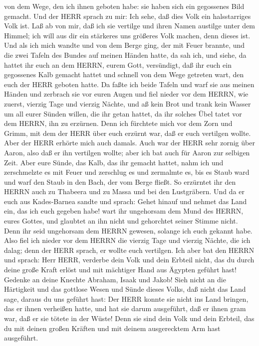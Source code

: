 von dem Wege, den ich ihnen geboten habe: sie haben sich ein gegossenes
Bild gemacht.  Und der HERR sprach zu mir: Ich sehe, daß
dies Volk ein halsstarriges Volk ist.  Laß ab von mir, daß
ich sie vertilge und ihren Namen austilge unter dem Himmel; ich will aus
dir ein stärkeres uns größeres Volk machen, denn dieses ist.
 Und als ich mich wandte und von dem Berge ging, der mit
Feuer brannte, und die zwei Tafeln des Bundes auf meinen Händen hatte,
 da sah ich, und siehe, da hattet ihr euch an dem HERRN,
eurem Gott, versündigt, daß ihr euch ein gegossenes Kalb gemacht hattet
und schnell von dem Wege getreten wart, den euch der HERR geboten hatte.
 Da faßte ich beide Tafeln und warf sie aus meinen Händen
und zerbrach sie vor euren Augen  und fiel nieder vor dem
HERRN, wie zuerst, vierzig Tage und vierzig Nächte, und aß kein Brot und
trank kein Wasser um all eurer Sünden willen, die ihr getan hattet, da
ihr solches Übel tatet vor dem HERRN, ihn zu erzürnen. 
Denn ich fürchtete mich vor dem Zorn und Grimm, mit dem der HERR über
euch erzürnt war, daß er euch vertilgen wollte. Aber der HERR erhörte
mich auch damals.  Auch war der HERR sehr zornig über
Aaron, also daß er ihn vertilgen wollte; aber ich bat auch für Aaron zur
selbigen Zeit.  Aber eure Sünde, das Kalb, das ihr gemacht
hattet, nahm ich und zerschmelzte es mit Feuer und zerschlug es und
zermalmte es, bis es Staub ward und warf den Staub in den Bach, der vom
Berge fließt.  So erzürntet ihr den HERRN auch zu Thabeera
und zu Massa und bei den Lustgräbern.  Und da er euch aus
Kades-Barnea sandte und sprach: Gehet hinauf und nehmet das Land ein,
das ich euch gegeben habe! wart ihr ungehorsam dem Mund des HERRN, eures
Gottes, und glaubtet an ihn nicht und gehorchtet seiner Stimme nicht.
 Denn ihr seid ungehorsam dem HERRN gewesen, solange ich
euch gekannt habe.  Also fiel ich nieder vor dem HERRN die
vierzig Tage und vierzig Nächte, die ich dalag; denn der HERR sprach, er
wollte euch vertilgen.  Ich aber bat den HERRN und sprach:
Herr HERR, verderbe dein Volk und dein Erbteil nicht, das du durch deine
große Kraft erlöst und mit mächtiger Hand aus Ägypten geführt hast!
 Gedenke an deine Knechte Abraham, Isaak und Jakob! Sieh
nicht an die Härtigkeit und das gottlose Wesen und Sünde dieses Volks,
 daß nicht das Land sage, daraus du uns geführt hast: Der
HERR konnte sie nicht ins Land bringen, das er ihnen verheißen hatte,
und hat sie darum ausgeführt, daß er ihnen gram war, daß er sie tötete
in der Wüste!  Denn sie sind dein Volk und dein Erbteil,
das du mit deinen großen Kräften und mit deinem ausgerecktem Arm hast
ausgeführt.


